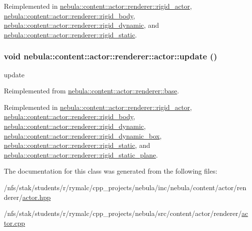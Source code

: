 Reimplemented in \hyperlink{classnebula_1_1content_1_1actor_1_1renderer_1_1rigid__actor_a4e0cda8bb08115a62cbb8363ac439608}{nebula::content::actor::renderer::rigid\_\-actor}, \hyperlink{classnebula_1_1content_1_1actor_1_1renderer_1_1rigid__body_a5e76495c7870d3b88c5b32888f9fa504}{nebula::content::actor::renderer::rigid\_\-body}, \hyperlink{classnebula_1_1content_1_1actor_1_1renderer_1_1rigid__dynamic_a2ba4e3e381092c03c39d21248d635621}{nebula::content::actor::renderer::rigid\_\-dynamic}, and \hyperlink{classnebula_1_1content_1_1actor_1_1renderer_1_1rigid__static_a1423732157573e9276023a54471b3f3a}{nebula::content::actor::renderer::rigid\_\-static}.\hypertarget{classnebula_1_1content_1_1actor_1_1renderer_1_1actor_aec0ddac9c76aa3360fe97b49a651e1e2}{
\subsubsection[{update}]{\setlength{\rightskip}{0pt plus 5cm}void nebula::content::actor::renderer::actor::update ()}}
\label{classnebula_1_1content_1_1actor_1_1renderer_1_1actor_aec0ddac9c76aa3360fe97b49a651e1e2}


update 

Reimplemented from \hyperlink{classnebula_1_1content_1_1actor_1_1renderer_1_1base_afcde5bb9124d7a6b81053c15b4322e0e}{nebula::content::actor::renderer::base}.

Reimplemented in \hyperlink{classnebula_1_1content_1_1actor_1_1renderer_1_1rigid__actor_a650ae9b6164016a9180817d7b077326f}{nebula::content::actor::renderer::rigid\_\-actor}, \hyperlink{classnebula_1_1content_1_1actor_1_1renderer_1_1rigid__body_a11f37d90346888f7dc70cae54954a584}{nebula::content::actor::renderer::rigid\_\-body}, \hyperlink{classnebula_1_1content_1_1actor_1_1renderer_1_1rigid__dynamic_a53122ec3edecc185ebe31a8bb38be920}{nebula::content::actor::renderer::rigid\_\-dynamic}, \hyperlink{classnebula_1_1content_1_1actor_1_1renderer_1_1rigid__dynamic__box_af93072ba126df030c9eb4ec7d2898104}{nebula::content::actor::renderer::rigid\_\-dynamic\_\-box}, \hyperlink{classnebula_1_1content_1_1actor_1_1renderer_1_1rigid__static_a3e3b767391a538db88e91035cca7c3dd}{nebula::content::actor::renderer::rigid\_\-static}, and \hyperlink{classnebula_1_1content_1_1actor_1_1renderer_1_1rigid__static__plane_a3ef08d440181a74d4428ebef83607963}{nebula::content::actor::renderer::rigid\_\-static\_\-plane}.

The documentation for this class was generated from the following files:\begin{DoxyCompactItemize}
\item 
/nfs/stak/students/r/rymalc/cpp\_\-projects/nebula/inc/nebula/content/actor/renderer/\hyperlink{renderer_2actor_8hpp}{actor.hpp}\item 
/nfs/stak/students/r/rymalc/cpp\_\-projects/nebula/src/content/actor/renderer/\hyperlink{renderer_2actor_8cpp}{actor.cpp}\end{DoxyCompactItemize}
